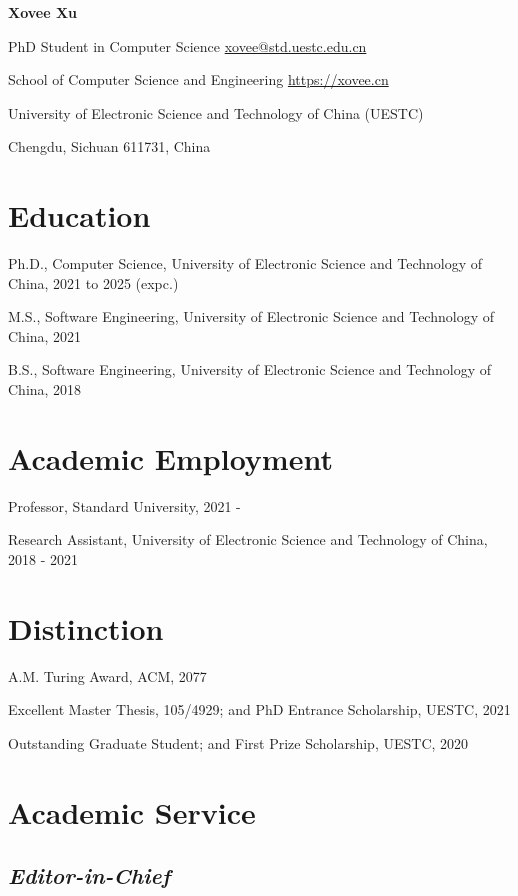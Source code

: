 \documentclass{article}
\newcommand{\CVsection}[1]{
    \vspace{-8pt}
    \section*{#1}
    \vspace{-4pt}
}
\newcommand{\CVsubsection}[1]{
    \subsection*{\textnormal{\textit{#1}}}
}
\begin{document}
\begin{center}
    \vspace*{5pt}
    \Huge{
    \textbf{Xovee Xu}}
\end{center}
\vspace{15pt}

\setlength{\parskip}{1pt}

\noindent PhD Student in Computer Science \hfill \href{mailto:xovee@std.uestc.edu.cn}{xovee@std.uestc.edu.cn}

\noindent School of Computer Science and Engineering \hfill \url{https://xovee.cn}

\noindent University of Electronic Science and Technology of China (UESTC)

\noindent Chengdu, Sichuan 611731, China

\setlength{\parskip}{3pt}




\CVsection{Education}
\indent 

Ph.D., Computer Science, University of Electronic Science and Technology of China, 2021 to 2025 (expc.)

M.S., Software Engineering, University of Electronic Science and Technology of China, 2021

B.S., Software Engineering, University of Electronic Science and Technology of China, 2018

\CVsection{Academic Employment}
\indent

Professor, Standard University, 2021 - 

Research Assistant, University of Electronic Science and Technology of China, 2018 - 2021




\CVsection{Distinction}
\indent

A.M. Turing Award, ACM, 2077

Excellent Master Thesis, 105/4929; and PhD Entrance Scholarship, UESTC, 2021

Outstanding Graduate Student; and First Prize Scholarship, UESTC, 2020




\CVsection{Academic Service}

\CVsubsection{Editor-in-Chief}
\vspace{-4pt}
\indent
\end{document}
